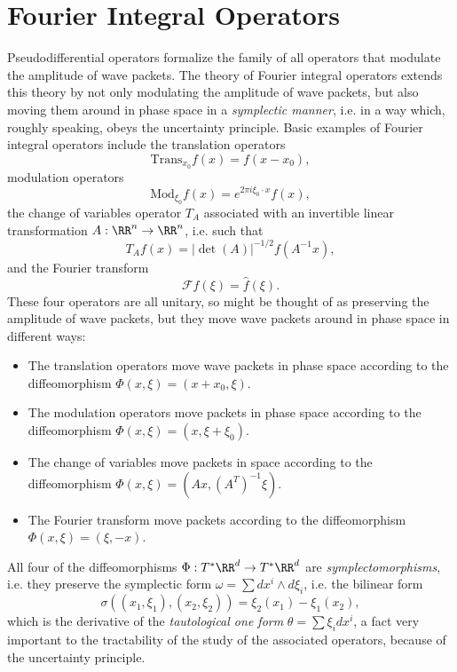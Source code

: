 \chapter{Fourier Integral Operators}

Pseudodifferential operators formalize the family of all operators that modulate the amplitude of wave packets. The theory of Fourier integral operators extends this theory by not only modulating the amplitude of wave packets, but also moving them around in phase space in a \emph{symplectic manner}, i.e. in a way which, roughly speaking, obeys the uncertainty principle. Basic examples of Fourier integral operators include the translation operators
%
\[ \text{Trans}_{x_0} f(x) = f(x - x_0), \]
%
modulation operators
%
\[ \text{Mod}_{\xi_0} f(x) = e^{2 \pi i \xi_0 \cdot x} f(x), \]
%
the change of variables operator $T_A$ associated with an invertible linear transformation $A: \RR^n \to \RR^n$, i.e. such that
%
\[ T_A f(x) =  |\det(A)|^{-1/2} f(A^{-1} x), \]
%
and the Fourier transform
%
\[ \mathcal{F}f(\xi) = \widehat{f}(\xi). \]
%
These four operators are all unitary, so might be thought of as preserving the amplitude of wave packets, but they move wave packets around in phase space in different ways:
%
\begin{itemize}
    \item The translation operators move wave packets in phase space according to the diffeomorphism $\Phi(x,\xi) = (x + x_0, \xi)$.

    \item The modulation operators move packets in phase space according to the diffeomorphism $\Phi(x,\xi) = (x,\xi + \xi_0)$.

    \item The change of variables move packets in space according to the diffeomorphism $\Phi(x,\xi) = (Ax, (A^T)^{-1} \xi)$.

    \item The Fourier transform move packets according to the diffeomorphism $\Phi(x,\xi) = (\xi,-x)$.
\end{itemize}
%
All four of the diffeomorphisms $\Phi: T^* \RR^d \to T^* \RR^d$ are \emph{symplectomorphisms}, i.e. they preserve the symplectic form $\omega = \sum dx^i \wedge d\xi_i$, i.e. the bilinear form
%
\[ \sigma((x_1,\xi_1), (x_2,\xi_2)) = \xi_2(x_1) - \xi_1(x_2), \]
%
which is the derivative of the \emph{tautological one form} $\theta = \sum \xi_i dx^i$, a fact very important to the tractability of the study of the associated operators, because of the uncertainty principle.

